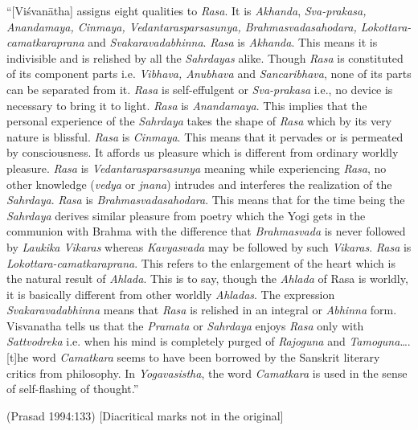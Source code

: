 \begin{myquote}
“[Viśvanātha] assigns eight qualities to \textsl{Rasa}. It is \textsl{Akhanda}, \textsl{Sva-prakasa, Anandamaya, Cinmaya, Vedantarasparsasunya, Brahmasvadasahodara, Loko\-ttara-camatkaraprana} and \textsl{Svakaravadabhinna}. \textsl{Rasa} is \textsl{Akhanda}. This means it is indivisible and is relished by all the \textsl{Sahrdayas} alike. Though \textsl{Rasa} is constituted of its component parts i.e. \textsl{Vibhava, Anubhava} and \textsl{Sancaribhava}, none of its parts can be separated from it. \textsl{Rasa} is self-effulgent or \textsl{Sva-prakasa} i.e., no device is necessary to bring it to light. \textsl{Rasa} is \textsl{Anandamaya}. This implies that the personal experience of the \textsl{Sahrdaya} takes the shape of \textsl{Rasa} which by its very nature is blissful. \textsl{Rasa} is \textsl{Cinmaya}. This means that it pervades or is permeated by consciousness. It affords us pleasure which is different from ordinary worldly pleasure. \textsl{Rasa} is \textsl{Vedantarasparsasunya} meaning while experiencing \textsl{Rasa}, no other knowledge (\textsl{vedya} or \textsl{jnana}) intrudes and interferes the realization of the \textsl{Sahrdaya}. \textsl{Rasa} is \textsl{Brahmasvadasahodara}. This means that for the time being the \textsl{Sahrdaya} derives similar pleasure from poetry which the Yogi gets in the communion with Brahma with the difference that \textsl{Brahmasvada} is never followed by \textsl{Laukika Vikaras} whereas \textsl{Kavyasvada} may be followed by such \textsl{Vikaras}. \textsl{Rasa} is \textsl{Lokottara-camatkaraprana}. This refers to the enlargement of the heart which is the natural result of \textsl{Ahlada}. This is to say, though the \textsl{Ahlada} of Rasa is worldly, it is basically different from other worldly \textsl{Ahladas}. The expression \textsl{Svakaravadabhinna} means that \textsl{Rasa} is relished in an integral or \textsl{Abhinna} form. Visvanatha tells us that the \textsl{Pramata} or \textsl{Sahrdaya} enjoys \textsl{Rasa} only with \textsl{Sattvodreka} i.e. when his mind is completely purged of \textsl{Rajoguna} and \textsl{Tamoguna}….[t]he word \textsl{Camatkara} seems to have been borrowed by the Sanskrit literary critics from philosophy. In \textsl{Yogavasistha}, the word \textsl{Camatkara} is used in the sense of self-flashing of thought.” 

\hfill (Prasad 1994:133) [Diacritical marks not in the original]
\end{myquote}


